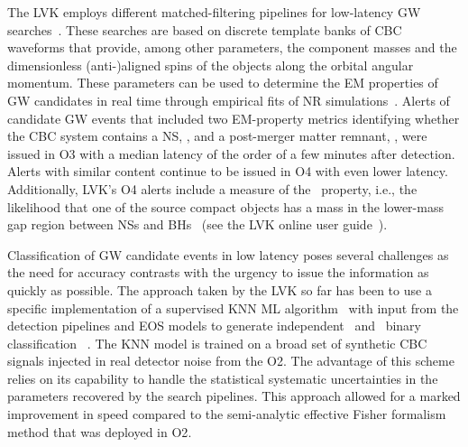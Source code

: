 The \ac{LVK} employs different matched-filtering pipelines for low-latency \ac{GW}
searches~\cite{Sachdev:2019vvd,PhysRevD.95.042001,Sachdev:2020lfd,Nitz:2018rgo,Adams:2015ulm,Chu:2020pjv,Klimenko:2015ypf}. These searches are based on discrete template banks of \ac{CBC}
waveforms that provide, among other parameters, the component masses and the dimensionless (anti-)aligned spins of the objects along the orbital angular momentum. These parameters can be
used to determine the \ac{EM} properties of \ac{GW} candidates in real time through empirical fits of \ac{NR} simulations~\cite{Foucart:2012nc,Foucart:2018rjc}. Alerts of candidate
\ac{GW} events that included two \ac{EM}-property metrics identifying whether the \ac{CBC} system contains a \ac{NS}, \hasns, and a post-merger matter remnant, \hasrem, were issued in
\ac{O3} with a median latency of the order of a few minutes after detection. Alerts with similar content continue to be issued in \ac{O4} with even lower latency.  Additionally,
\ac{LVK}'s \ac{O4} alerts include a measure of the \hasgap\ property, i.e., the likelihood that one of the source compact objects has a mass in the lower-mass gap region between \acp{NS}
and \acp{BH}~\cite{Farah:2021qom} (see the \ac{LVK} online user guide~\cite{UserGuide}). 

Classification of \ac{GW} candidate events in low latency poses several challenges as the need for accuracy contrasts with the urgency to issue the information as quickly as possible. The
approach taken by the \ac{LVK} so far has been to use a specific implementation of a supervised \ac{KNN} \ac{ML}
algorithm~\cite{Pedregosa:2011ork} with input from the detection pipelines and \ac{EOS} models to generate independent \hasns\ and \hasrem\ binary classification
~\cite{Chatterjee:2019avs}. The \ac{KNN} model is trained on a broad set of synthetic \ac{CBC} signals injected in real detector noise from the \ac{O2}. The advantage of this
scheme relies on its capability to handle the statistical systematic uncertainties in the parameters recovered by the search pipelines. This approach allowed for a marked improvement in
speed compared to the semi-analytic effective Fisher formalism method that was deployed in \ac{O2}.

